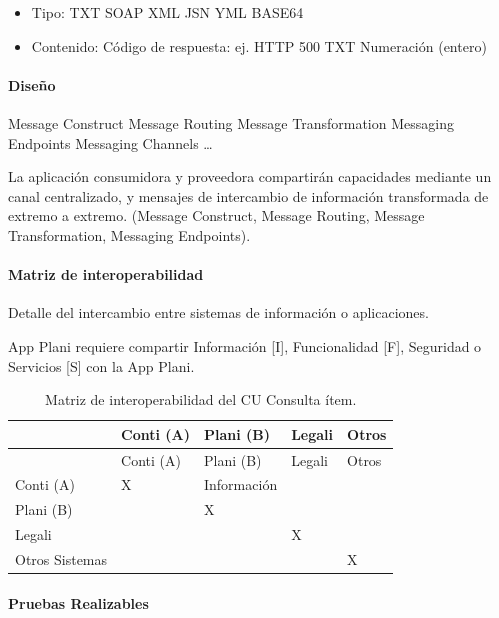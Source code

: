 \documentclass[
  paper=a4,
  ,captions=tableheading
]{scrartcl}
\providecommand{\tightlist}{%
  \setlength{\itemsep}{0pt}\setlength{\parskip}{0pt}}
\begin{document}
\begin{itemize}
\tightlist
\item
  Tipo: TXT \textbar{} SOAP \textbar{} XML \textbar{} JSN \textbar{} YML
  \textbar{} BASE64
\item
  Contenido: Código de respuesta: ej. HTTP 500 \textbar{} TXT \textbar{}
  Numeración (entero)
\end{itemize}

\paragraph{Diseño}\label{sec:diseuxf1o-1}

Message Construct \textbar{} Message Routing \textbar{} Message
Transformation \textbar{} Messaging Endpoints \textbar{} Messaging
Channels \textbar{} \ldots{}

La aplicación consumidora y proveedora compartirán capacidades mediante
un canal centralizado, y mensajes de intercambio de información
transformada de extremo a extremo. (Message Construct, Message Routing,
Message Transformation, Messaging Endpoints).

\paragraph{Matriz de
interoperabilidad}\label{sec:matriz-de-interoperabilidad-1}

Detalle del intercambio entre sistemas de información o aplicaciones.

App Plani requiere compartir Información {[}I{]}, Funcionalidad {[}F{]},
Seguridad o Servicios {[}S{]} con la App Plani.

\begin{longtable}[]{@{}lllll@{}}
\caption{Matriz de interoperabilidad del CU Consulta
ítem.}\tabularnewline
\toprule\noalign{}
& Conti (A) & Plani (B) & Legali & Otros \\
\midrule\noalign{}
\endfirsthead
\toprule\noalign{}
& Conti (A) & Plani (B) & Legali & Otros \\
\midrule\noalign{}
\endhead
\bottomrule\noalign{}
\endlastfoot
Conti (A) & X & Información & & \\
Plani (B) & & X & & \\
Legali & & & X & \\
Otros Sistemas & & & & X \\
\end{longtable}

\paragraph{Pruebas Realizables}\label{sec:pruebas-realizables-1}
\end{document}
